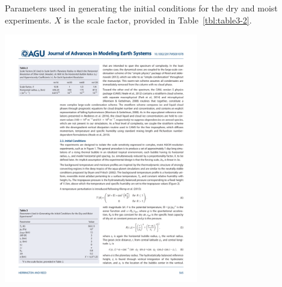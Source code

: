 \begin{table}
\caption{Parameters used in generating the initial conditions for the dry and moist experiments. $X$ is the scale factor, provided in Table~\ref{tbl:table3-2}.}
\begin{center}
\noindent\includegraphics[width=20pc,angle=0]{chapter3/table3.pdf}\\
\end{center}
\label{tbl:table3-3}
\end{table}

